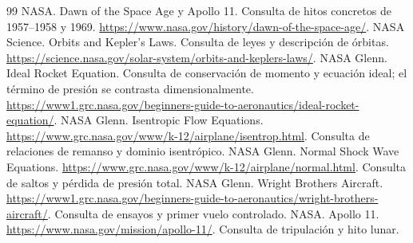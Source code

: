\begin{thebibliography}{99}
 NASA. Dawn of the Space Age y Apollo 11. Consulta de hitos concretos de 1957–1958 y 1969. \url{https://www.nasa.gov/history/dawn-of-the-space-age/}.
 NASA Science. Orbits and Kepler’s Laws. Consulta de leyes y descripción de órbitas. \url{https://science.nasa.gov/solar-system/orbits-and-keplers-laws/}.
 NASA Glenn. Ideal Rocket Equation. Consulta de conservación de momento y ecuación ideal; el término de presión se contrasta dimensionalmente. \url{https://www1.grc.nasa.gov/beginners-guide-to-aeronautics/ideal-rocket-equation/}.
 NASA Glenn. Isentropic Flow Equations. \url{https://www.grc.nasa.gov/www/k-12/airplane/isentrop.html}. Consulta de relaciones de remanso y dominio isentrópico.
 NASA Glenn. Normal Shock Wave Equations. \url{https://www.grc.nasa.gov/www/k-12/airplane/normal.html}. Consulta de saltos y pérdida de presión total.
 NASA Glenn. Wright Brothers Aircraft. \url{https://www1.grc.nasa.gov/beginners-guide-to-aeronautics/wright-brothers-aircraft/}. Consulta de ensayos y primer vuelo controlado.
 NASA. Apollo 11. \url{https://www.nasa.gov/mission/apollo-11/}. Consulta de tripulación y hito lunar.
\end{thebibliography}
